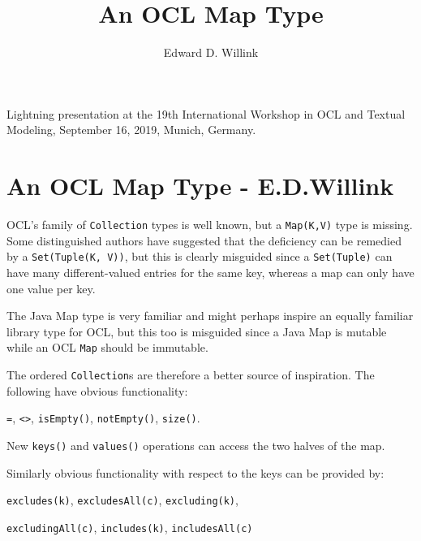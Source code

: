 \documentclass{llncs}
\begin{document}
%
\mainmatter              %
%
\title{An OCL Map Type}
%
%
\author{Edward D. Willink}
%
%
%


\maketitle              %
Lightning presentation at the 19th International Workshop in OCL and Textual Modeling, September 16, 2019, Munich, Germany.
%
\pagebreak
%
\section{An OCL Map Type - E.D.Willink}
OCL's family of \verb$Collection$ types is well known, but a \verb$Map(K,V)$ type is missing. Some distinguished authors have suggested that the deficiency can be remedied by a \verb$Set(Tuple(K, V))$, but this is clearly misguided since a \verb$Set(Tuple)$ can have many different-valued entries for the same key, whereas a map can only have one value per key.

The Java Map type is very familiar and might perhaps inspire an equally familiar library type for OCL, but this too is misguided since a Java Map is mutable while an OCL \verb$Map$ should be immutable.

The ordered \verb$Collection$s are therefore a better source of inspiration. The following have obvious functionality:

\verb$=$, \verb$<>$, \verb$isEmpty()$, \verb$notEmpty()$, \verb$size()$.

New \verb$keys()$ and \verb$values()$ operations can access the two halves of the map. 

Similarly obvious functionality with respect to the keys can be provided  by:

\verb$excludes(k)$, \verb$excludesAll(c)$, \verb$excluding(k)$,

\verb$excludingAll(c)$, \verb$includes(k)$, \verb$includesAll(c)$
\end{document}

